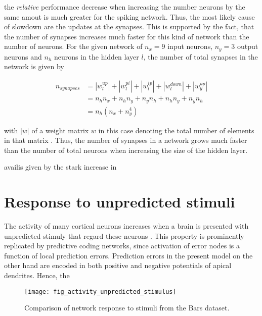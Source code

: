 the \textit{relative} performance decrease when increasing the number neurons by the same amout is much greater for the
spiking network. Thus, the most likely cause of slowdown are the updates at the synapses. This is supported by the fact,
that the number of synapses increases much faster for this kind of network than the number of neurons. For the given
network of $n_{x} = 9$ input neurons, $n_y = 3$ output neurons and $n_{h}$ neurons in the hidden layer $l$, the number
of total synapses in the network is given by

\begin{align}
    n_{synapses} & = |w_{l}^{up}| + |w_{l}^{pi}| + |w_{l}^{ip}| + |w_{l}^{down}| + |w_{y}^{up}| \\
                 & = n_h n_x + n_h n_y + n_y n_h  + n_h n_y + n_y  n_h                          \\
                 & = n_h (n_x + n_y^4)
\end{align}

with $|w|$ of a weight matrix $w$ in this case denoting the total number of elements in that matrix . Thus, the number of synapses in a network grows much faster than the number of total
    neurons when increasing the size of the hidden layer.

availis given by the stark increase in

\section{Response to unpredicted stimuli}

The activity of many cortical neurons increases when a brain is presented with unpredicted stimuly that regard these
neurons . This property is prominently replicated by
predictive coding networks, since activation of error nodes is a function of local prediction errors. Prediction errors
in the present model on the other hand are encoded in both positive and negative potentials of apical dendrites. Hence,
the

\begin{figure}[t]
    \centering
    \texttt{[image: fig\_activity\_unpredicted\_stimulus]}
    \caption{Comparison of network response to stimuli from the Bars dataset.}
    \label{fig-stimulus-response}
\end{figure}




